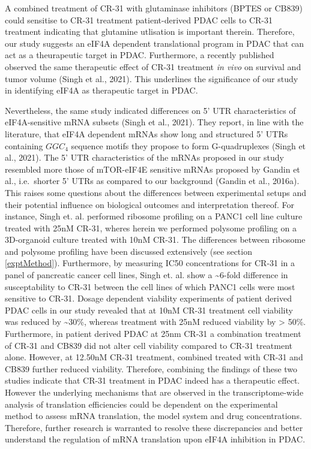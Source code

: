 \documentclass[12pt,openany]{book}
\begin{document}
A combined treatment of CR-31 with glutaminase inhibitors (BPTES or
CB839) could sensitise to CR-31 treatment patient-derived PDAC cells to
CR-31 treatment indicating that glutamine utlisation is important
therein. Therefore, our study suggests an eIF4A dependent translational
program in PDAC that can act as a theurapeutic target in PDAC.
Furthermore, a recently published observed the same therapeutic effect
of CR-31 treatment \emph{in vivo} on survival and tumor volume (Singh et
al., 2021). This underlines the significance of our study in identifying
eIF4A as therapeutic target in PDAC.

Nevertheless, the same study indicated differences on 5' UTR
characteristics of eIF4A-sensitive mRNA subsets (Singh et al., 2021).
They report, in line with the literature, that eIF4A dependent mRNAs
show long and structured 5' UTRs containing \(GGC_4\) sequence motifs
they propose to form G-quadruplexes (Singh et al., 2021). The 5' UTR
characteristics of the mRNAs proposed in our study resembled more those
of mTOR-eIF4E sensitive mRNAs proposed by Gandin et al., i.e.~shorter 5'
UTRs as compared to our background (Gandin et al., 2016a). This raises
some questions about the differences between experimental setups and
their potential influence on biological outcomes and interpretation
thereof. For instance, Singh et. al. performed ribosome profiling on a
PANC1 cell line culture treated with 25nM CR-31, wheres herein we
performed polysome profiling on a 3D-organoid culture treated with 10nM
CR-31. The differences between ribosome and polysome profiling have been
discussed extensively (see section \ref{exptMethod}). Furthermore, by
measuring IC50 concentrations for CR-31 in a panel of pancreatic cancer
cell lines, Singh et. al. show a \textasciitilde{}6-fold difference in
susceptability to CR-31 between the cell lines of which PANC1 cells were
most sensitive to CR-31. Dosage dependent viability experiments of
patient derived PDAC cells in our study revealed that at 10nM CR-31
treatment cell viability was reduced by \textasciitilde{}30\%, whereas
treatment with 25nM reduced viability by \textgreater{} 50\%.
Furthermore, in patient derived PDAC at 25nm CR-31 a combination
treatment of CR-31 and CB839 did not alter cell viability compared to
CR-31 treatment alone. However, at 12.50nM CR-31 treatment, combined
treated with CR-31 and CB839 further reduced viability. Therefore,
combining the findings of these two studies indicate that CR-31
treatment in PDAC indeed has a therapeutic effect. However the
underlying mechanisms that are observed in the transcriptome-wide
analysis of translation efficiencies could be dependent on the
experimental method to assess mRNA translation, the model system and
drug concentrations. Therefore, further research is warranted to resolve
these discrepancies and better understand the regulation of mRNA
translation upon eIF4A inhibition in PDAC. \newline
\end{document}
